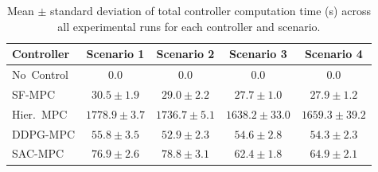 \begin{table}[htbp]
\centering
\caption{Mean $\pm$ standard deviation of total controller computation time (s) across all experimental runs for each controller and scenario.}
\label{tab:comp_time_comparison}
\begin{tabular}{lcccc}
\toprule
Controller & Scenario 1 & Scenario 2 & Scenario 3 & Scenario 4 \\
\midrule
No~Control & $0.0$ & $0.0$ & $0.0$ & $0.0$ \\
SF-MPC & $30.5 \pm 1.9$ & $29.0 \pm 2.2$ & $27.7 \pm 1.0$ & $27.9 \pm 1.2$ \\
Hier.~MPC & $1778.9 \pm 3.7$ & $1736.7 \pm 5.1$ & $1638.2 \pm 33.0$ & $1659.3 \pm 39.2$ \\
DDPG-MPC & $55.8 \pm 3.5$ & $52.9 \pm 2.3$ & $54.6 \pm 2.8$ & $54.3 \pm 2.3$ \\
SAC-MPC & $76.9 \pm 2.6$ & $78.8 \pm 3.1$ & $62.4 \pm 1.8$ & $64.9 \pm 2.1$ \\
\bottomrule
\end{tabular}
\end{table}
